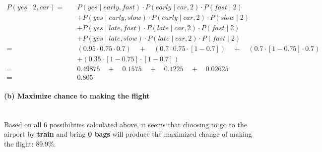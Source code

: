 \documentclass[12pt,letterpaper]{article}
\begin{document}
\begin{align*}
    P(yes \mid 2, car) = \quad &P(yes \mid early, fast) \cdot P(early \mid car, 2) \cdot P(fast \mid 2) \\
                                &+ P(yes \mid early, slow) \cdot P(early \mid car, 2) \cdot P(slow \mid 2) \\
                                &+ P(yes \mid late, fast) \cdot P(late \mid car, 2) \cdot P(fast \mid 2) \\
                                &+ P(yes \mid late, slow) \cdot P(late \mid car, 2) \cdot P(fast \mid 2) \\
    = \quad &(0.95 \cdot 0.75 \cdot 0.7) \quad + \quad (0.7 \cdot 0.75 \cdot [1-0.7]) \quad + \quad (0.7 \cdot [1-0.75] \cdot 0.7) \\
            &+ (0.35 \cdot [1-0.75] \cdot [1-0.7]) \\
    = \quad &0.49875 \quad + \quad 0.1575 \quad + \quad 0.1225 \quad + \quad 0.02625 \\
    = \quad &0.805
\end{align*}

\paragraph{(b) Maximize chance to making the flight}  \mbox{}\\

Based on all 6 possibilities calculated above, it seems that choosing to go to the airport by \textbf{train} and bring \textbf{0 bags} will produce the maximized change of making the flight: $89.9\%$. 
\end{document}
